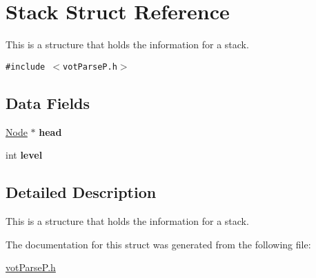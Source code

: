 \hypertarget{structStack}{
\section{Stack Struct Reference}
\label{structStack}
}
This is a structure that holds the information for a stack.  


{\tt \#include $<$votParseP.h$>$}

\subsection*{Data Fields}
\begin{CompactItemize}
\item 
\hypertarget{structStack_50bfdf880cfde1bf714a7ca9eb1eeae3}{
\hyperlink{structNode}{Node} $\ast$ \textbf{head}}
\label{structStack_50bfdf880cfde1bf714a7ca9eb1eeae3}

\item 
\hypertarget{structStack_980bcca9b29a635b3e70bfdcbb6f1a34}{
int \textbf{level}}
\label{structStack_980bcca9b29a635b3e70bfdcbb6f1a34}

\end{CompactItemize}


\subsection{Detailed Description}
This is a structure that holds the information for a stack. 

The documentation for this struct was generated from the following file:\begin{CompactItemize}
\item 
\hyperlink{votParseP_8h}{votParseP.h}\end{CompactItemize}
